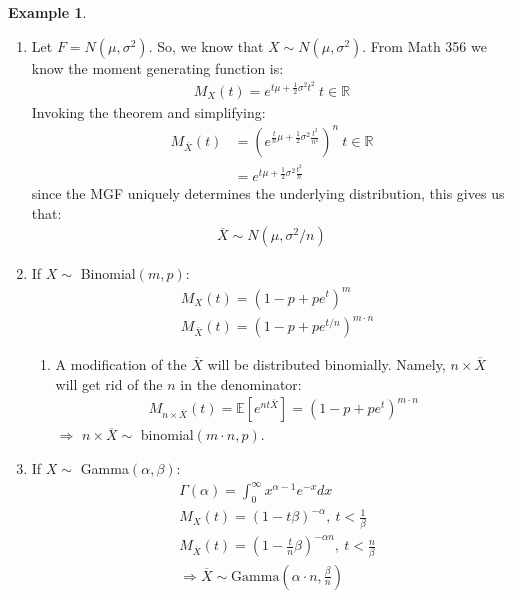 \documentclass[11pt]{scrartcl}
\newcommand{\R}[0]{\mathbb{R}}
\theoremstyle{definition}
\newtheorem{ex}{Example}
\theoremstyle{remark}
\newcommand{\EX}[1]{\mathbb{E}\left[#1 \right]}
\newcommand{\idx}[2]{\int_{#1}^{#2}}
\begin{document}
\begin{ex}
	\begin{enumerate}[noitemsep]
		\item Let $F = N(\mu, \sigma^2)$. So, we know that $X \sim N(\mu, \sigma^2)$. From Math 356 we know the moment generating function is: 
		\begin{align*}
			M_X(t) = e^{t\mu + \frac{1}{2} \sigma^2 t^2}\ t \in \R	
		\end{align*}
		Invoking the theorem and simplifying:  
		\begin{align*}
			M_{\overline{X}} (t) & = \left(e^{\frac{t}{n}\mu + \frac{1}{2} \sigma^2 \frac{t^2}{n^2}} \right)^n\ t \in \R	\\
			& = e^{t\mu + \frac{1}{2} \sigma^2\frac{t^2}{n}} 
		\end{align*}
		since the MGF uniquely determines the underlying distribution, this gives us that: 
		\begin{align*}
			\overline{X} \sim N(\mu, \sigma^2/n) 	
		\end{align*}
		\item If $X \sim $ Binomial$	(m, p)$: 
		\begin{align*}
			& M_X(t) = (1-p+pe^t)^m \\	
			& M_{\overline{X}}(t) = (1 - p + pe^{t/n})^{m \cdot n} 
		\end{align*}

		\begin{enumerate}[noitemsep]
			\item A modification of the $\overline{X}$ will be distributed binomially. Namely, $n \times \overline{X}$ will get rid of the $n$ in the denominator: 
			\begin{align*}
				M_{n \times \overline{X}} (t) = \EX{ e^{nt\overline{X}} } = (1-p+pe^t)^{m \cdot n } 	
			\end{align*}
			$ \Rightarrow $ $n \times \overline{X} \sim $ binomial$(m \cdot n, p)$. 
		\end{enumerate}
		\item If $X \sim $ Gamma$(\alpha, \beta)$: 
		\begin{align*}
			& \Gamma (\alpha) = \idx{0}{\infty} 	x ^{\alpha - 1} e^{-x} dx \\
			& M_X(t) = (1-t\beta)^{-\alpha},\ t < \frac{1}{\beta} \\
			& M_{\overline{X}}(t) = \left( 	1 - \frac{t}{n} \beta		\right)^{-\alpha n },\ t < \frac{n}{\beta} \\
			& \Rightarrow \overline{X} \sim \text{Gamma}\left( \alpha \cdot n, \frac{\beta}{n} \right) 
		\end{align*}
	\end{enumerate}
\end{ex}
\end{document}
